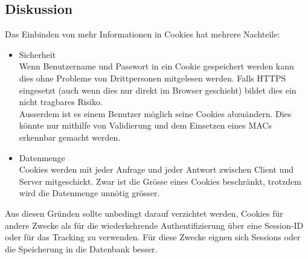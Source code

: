 \subsection*{Diskussion}
Das Einbinden von mehr Informationen in Cookies hat mehrere Nachteile:
\begin{itemize}
	\item Sicherheit \\
		Wenn Benutzername und Passwort in ein Cookie gespeichert werden kann dies ohne Probleme von Drittpersonen mitgelesen werden. Falls HTTPS eingesetzt (auch wenn dies nur direkt im Browser geschieht) bildet dies ein nicht tragbares Risiko. \\
		Ausserdem ist es einem Benutzer möglich seine Cookies abzuändern. Dies könnte nur mithilfe von Validierung und dem Einsetzen eines \glspl{MAC} erkennbar gemacht werden.
	\item Datenmenge \\
		Cookies werden mit jeder Anfrage und jeder Antwort zwischen Client und Server mitgeschickt. Zwar ist die Grösse eines Cookies beschränkt, trotzdem wird die Datenmenge unnötig grösser.
\end{itemize}

Aus diesen Gründen sollte unbedingt darauf verzichtet werden, Cookies für andere Zwecke als für die wiederkehrende Authentifizierung über eine Session-ID oder für das Tracking zu verwenden. Für diese Zwecke eignen sich Sessions oder die Speicherung in die Datenbank besser.